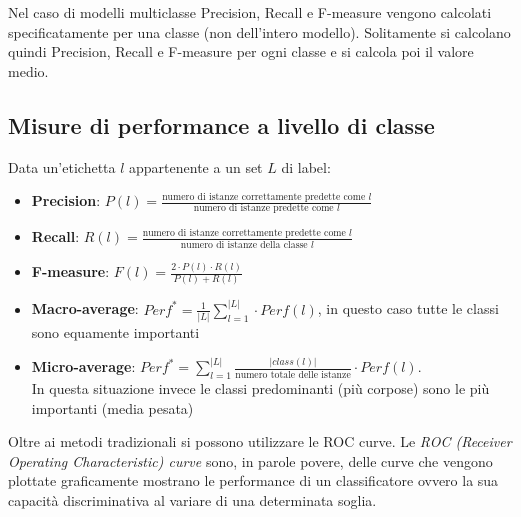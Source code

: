 Nel caso di modelli multiclasse Precision, Recall e F-measure vengono calcolati specificatamente per una classe (non dell’intero modello). Solitamente si calcolano quindi Precision, Recall e F-measure per ogni classe e si calcola poi il valore medio.

\subsection{Misure di performance a livello di classe}

Data un’etichetta $l$ appartenente a un set $L$ di label:
\begin{itemize}
    \item \textbf{Precision}: $P(l) = \displaystyle \frac{\text{numero di istanze correttamente predette come  } l}{\text{numero di istanze predette come }l}$
    \item \textbf{Recall}: $R(l) = \displaystyle \frac{\text{numero di istanze correttamente predette come  } l}{\text{numero di istanze della classe }l}$
    \item \textbf{F-measure}: $F(l) = \displaystyle \frac{2 \cdot P(l) \cdot R(l)}{P(l) + R(l)}$
    \item \textbf{Macro-average}: $Perf^* = \displaystyle \frac{1}{|L|} \sum_{l=1}^{|L|} \cdot Perf(l)$, in questo caso tutte le classi sono equamente importanti
    \item \textbf{Micro-average}: $Perf^* = \displaystyle \sum_{l=1}^{|L|} \frac{|class(l)|}{\text{numero totale delle istanze}} \cdot Perf(l)$. \\ In questa situazione invece le classi predominanti (più corpose) sono le più importanti (media pesata)
\end{itemize}

Oltre ai metodi tradizionali si possono utilizzare le ROC curve. Le \textit{ROC (Receiver Operating Characteristic) curve} sono, in parole povere, delle curve che vengono plottate graficamente mostrano le performance di un classificatore ovvero la sua capacità discriminativa al variare di una determinata soglia.\\


